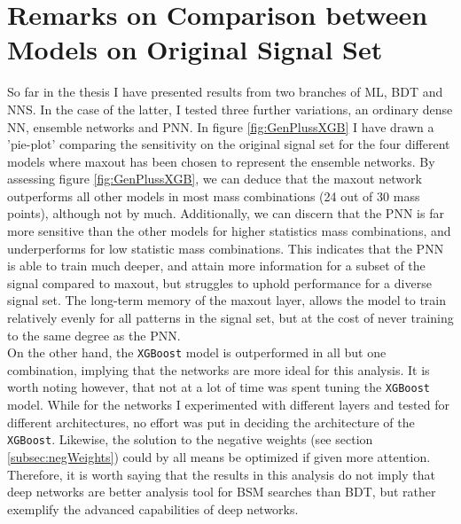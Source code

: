 \section{Remarks on Comparison between Models on Original Signal Set}
So far in the thesis I have presented results from two branches of \ac{ML}, \acf{BDT} and \acf{NNS}. In the case of the latter, I tested
three further variations, an ordinary dense \ac{NN}, ensemble networks and \ac{PNN}. In figure \ref{fig:GenPlussXGB} I have drawn a 'pie-plot' comparing 
the sensitivity on the original signal set for the four different models where maxout has been chosen to represent the ensemble networks. By assessing 
figure \ref{fig:GenPlussXGB}, we can deduce that the maxout network outperforms all other models in most mass combinations (24 out of 30 mass points), 
although not by much. Additionally, we can discern that the \ac{PNN} is far more sensitive than the other models for higher statistics mass combinations, 
and underperforms for low statistic mass combinations. This indicates that the \ac{PNN} is able to train much deeper, and attain more information for a 
subset of the signal compared to maxout, but struggles to uphold performance for a diverse signal set. The long-term memory of the maxout layer, 
allows the model to train relatively evenly for all patterns in the signal set, but at the cost of never training to the same degree as the \ac{PNN}.
\\
On the other hand, the \verb!XGBoost! model is outperformed in all but one combination, implying that the networks are more ideal for this analysis. 
It is worth noting however, that not at a lot of time was spent tuning the \verb!XGBoost! model. While for the networks I experimented with different layers and 
tested for different architectures, no effort was put in deciding the architecture of the \verb!XGBoost!. Likewise, the solution to the negative weights (see 
section \ref{subsec:negWeights}) could by all means be optimized if given more attention. Therefore, it is worth saying that the results in this analysis
do not imply that deep networks are better analysis tool for \ac{BSM} searches than \ac{BDT}, but rather exemplify the advanced capabilities of deep networks.
